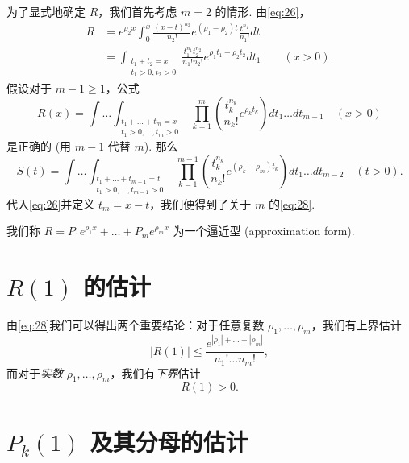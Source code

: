为了显式地确定 $R$，我们首先考虑 $m=2$ 的情形. 由\eqref{eq:26}，
\[ \begin{aligned} R &= e^{\rho_2 x} \int_0^x \frac{(x-t)^{n_2}}{n_2!} e^{(\rho_1 - \rho_2)t} \frac{t^{n_1}}{n_1!} dt \\ &= \int_{\substack{t_1 + t_2 = x \\ t_1 > 0, t_2 > 0}} \frac{t_1^{n_1} t_2^{n_2}}{n_1! n_2!} e^{\rho_1 t_1 + \rho_2 t_2} dt_1 \qquad (x>0). \end{aligned} \]
假设对于 $m-1 \geq 1$，公式
\begin{equation} R(x) = \int \dots \int_{\substack{t_1 + \dots + t_m = x \\ t_1 > 0, \dots, t_m > 0}} \prod_{k=1}^{m} \left( \frac{t_k^{n_k}}{n_k!} e^{\rho_k t_k} \right) dt_1 \dots dt_{m-1} \quad (x>0) \tag{28}\label{eq:28} \end{equation}
是正确的 (用 $m-1$ 代替 $m$). 那么
\[ S(t) = \int \dots \int_{\substack{t_1 + \dots + t_{m-1} = t \\ t_1 > 0, \dots, t_{m-1} > 0}} \prod_{k=1}^{m-1} \left( \frac{t_k^{n_k}}{n_k!} e^{(\rho_k - \rho_m)t_k} \right) dt_1 \dots dt_{m-2} \quad (t > 0). \]
代入\eqref{eq:26}并定义 $t_m=x-t$，我们便得到了关于 $m$ 的\eqref{eq:28}.

我们称 $R = P_1 e^{\rho_1 x} + \dots + P_m e^{\rho_m x}$ 为一个逼近型 (approximation form).

\section{$R(1)$ 的估计}

由\eqref{eq:28}我们可以得出两个重要结论：对于任意复数 $\rho_1,\ldots,\rho_m$，我们有上界估计
\begin{equation} |R(1)| \leq \frac{e^{|\rho_1| + \dots + |\rho_m|}}{n_1! \dots n_m!}, \tag{29}\label{eq:29} \end{equation}
而对于\textit{实数} $\rho_1, \dots, \rho_m$，我们有\textit{下界}估计
\begin{equation} R(1) > 0. \tag{30}\label{eq:30} \end{equation}

\section{$P_k(1)$ 及其分母的估计}

